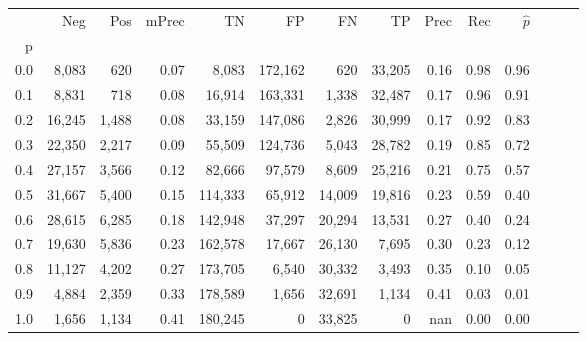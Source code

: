 \begin{tabular}{rrrrrrrrrrrrrr}
\toprule
{} &     Neg &    Pos & mPrec &       TN &       FP &      FN &      TP &  Prec &   Rec & $\hat{p}$ \\
p   &         &        &       &          &          &         &         &       &       &           \\
\midrule
0.0 &   8,083 &    620 &  0.07 &    8,083 &  172,162 &     620 &  33,205 &  0.16 &  0.98 &      0.96 \\
0.1 &   8,831 &    718 &  0.08 &   16,914 &  163,331 &   1,338 &  32,487 &  0.17 &  0.96 &      0.91 \\
0.2 &  16,245 &  1,488 &  0.08 &   33,159 &  147,086 &   2,826 &  30,999 &  0.17 &  0.92 &      0.83 \\
0.3 &  22,350 &  2,217 &  0.09 &   55,509 &  124,736 &   5,043 &  28,782 &  0.19 &  0.85 &      0.72 \\
0.4 &  27,157 &  3,566 &  0.12 &   82,666 &   97,579 &   8,609 &  25,216 &  0.21 &  0.75 &      0.57 \\
0.5 &  31,667 &  5,400 &  0.15 &  114,333 &   65,912 &  14,009 &  19,816 &  0.23 &  0.59 &      0.40 \\
0.6 &  28,615 &  6,285 &  0.18 &  142,948 &   37,297 &  20,294 &  13,531 &  0.27 &  0.40 &      0.24 \\
0.7 &  19,630 &  5,836 &  0.23 &  162,578 &   17,667 &  26,130 &   7,695 &  0.30 &  0.23 &      0.12 \\
0.8 &  11,127 &  4,202 &  0.27 &  173,705 &    6,540 &  30,332 &   3,493 &  0.35 &  0.10 &      0.05 \\
0.9 &   4,884 &  2,359 &  0.33 &  178,589 &    1,656 &  32,691 &   1,134 &  0.41 &  0.03 &      0.01 \\
1.0 &   1,656 &  1,134 &  0.41 &  180,245 &        0 &  33,825 &       0 &   nan &  0.00 &      0.00 \\
\bottomrule
\end{tabular}
